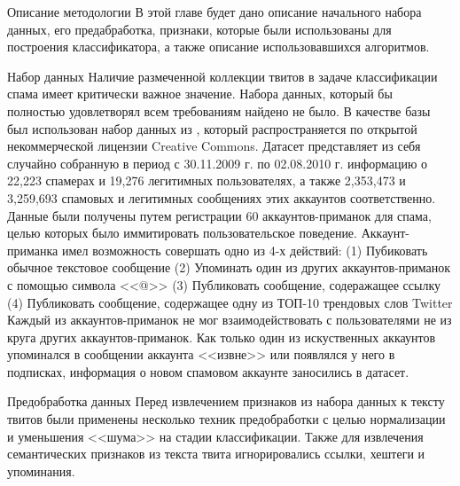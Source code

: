 

\begin{section}{Описание методологии}
   В этой главе будет дано описание начального набора данных,
   его предабработка, признаки, которые были использованы для построения классификатора, а также описание использовавшихся алгоритмов.
  \begin{subsection}{Набор данных}
    \label{sec:dataset}
    Наличие размеченной коллекции твитов в задаче классификации
    спама имеет критически важное значение.
    Набора данных, который бы полностью удовлетворял всем требованиям найдено не было.
    В качестве базы был использован набор данных из \cite{Lee}, который распространяется
    по открытой некоммерческой лицензии Creative Commons.
    Датасет представляет из себя случайно собранную в период с 30.11.2009 г. по 02.08.2010 г. информацию
    о 22,223 спамерах и 19,276 легитимных пользователях, а также 2,353,473 и 3,259,693
    спамовых и легитимных сообщениях этих аккаунтов соответственно.
    Данные были получены путем регистрации 60 аккаунтов-приманок для спама, целью которых
    было иммитировать пользовательское поведение.
    Аккаунт-приманка имел возможность совершать одно из 4-х действий: (1) Пубиковать обычное текстовое сообщение (2) Упоминать один из других аккаунтов-приманок с помощью символа <<@>>  (3) Публиковать сообщение, содеражащее ссылку (4) Публиковать сообщение, содержащее одну из ТОП-10 трендовых слов Twitter
    Каждый из аккаунтов-приманок не мог взаимодействовать
    с пользователями не из круга других аккаунтов-приманок. Как только один из искуственных аккаунтов упоминался в сообщении аккаунта <<извне>> или появлялся у него в подписках, информация о новом спамовом аккаунте заносились в датасет.


  \end{subsection}

  \begin{subsection}{Предобработка данных}
     Перед извлечением признаков из набора данных к тексту твитов были применены несколько техник предобработки с целью нормализации и уменьшения <<шума>> на стадии классификации.
     Также для извлечения семантических признаков из текста твита игнорировались ссылки, хештеги и упоминания.
  \end{subsection}


\end{section}
